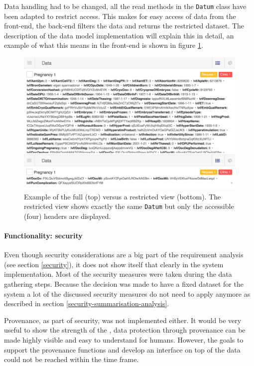 Data handling had to be changed, all the read methods in the {\tt Datum} class have been adapted to restrict access.
This makes for easy access of data from the front-end, the back-end filters the data and returns the restricted dataset.
The description of the data model implementation will explain this in detail, an example of what this means in the front-end is shown in figure \ref{fig:dataset-example}.

\begin{figure}[ht]
	\centering
	\includegraphics[width=1.0\linewidth]{images/datasets-example}
	\caption{
		Example of the full \projectdata{} (top) versus a restricted view (bottom).
		The restricted view shows exactly the same {\tt Datum} but only the accessible (four) headers are displayed.
	}
	\label{fig:dataset-example}
\end{figure}

\paragraph{Functionality: security}
Even though security considerations are a big part of the requirement analysis (see section \ref{security}), it does not show itself that clearly in the system implementation.
Most of the security measures were taken during the data gathering steps.
Because the decision was made to have a fixed dataset for the system a lot of the discussed security measures do not need to apply anymore as described in section \ref{security-summarisation-analysis}.

Provenance, as part of security, was not implemented either.
It would be very useful to show the strength of the \ivfsystem{}, data protection through provenance can be made highly visible and easy to understand for humans.
However, the goals to support the provenance functions and develop an interface on top of the data could not be reached within the time frame.

